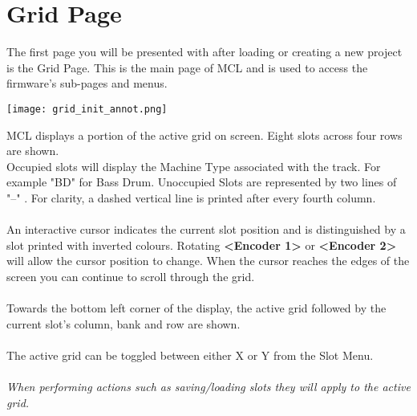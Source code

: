 
\chapter{Grid Page}
The first page you will be presented with after loading or creating a new project is the Grid Page. This is the main page of MCL and is used to access the firmware's sub-pages and menus.

\begin{center}
	\texttt{[image: grid\_init\_annot.png]}
\end{center}
MCL displays a portion of the active grid on screen. 
Eight slots across four rows are shown.\\
Occupied slots will display the Machine Type associated with the track. For example "BD" for Bass Drum. Unoccupied Slots are represented by two lines of "--" . For clarity, a dashed vertical line is printed after every fourth column.\\\\
An interactive cursor indicates the current slot position and is distinguished by a slot printed with inverted colours. Rotating \textbf{<Encoder 1>} or \textbf{<Encoder 2>} will allow the cursor position to change. When the cursor reaches the edges of the screen you can continue to scroll through the grid.
\\\\
Towards the bottom left corner of the display, the active grid followed by the current slot's column, bank and row are shown.\\\\
The active grid can be toggled between either X or Y from the Slot Menu.\\\\
\textit{When performing actions such as saving/loading slots they will apply to the active grid.}
